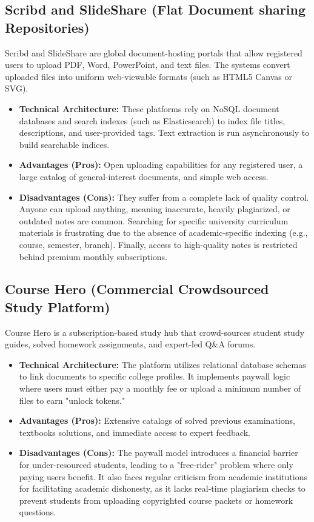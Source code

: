 \documentclass[12,Times new Roman,a4paper]{report}
\begin{document}
\subsection{Scribd and SlideShare (Flat Document sharing Repositories)}
Scribd and SlideShare are global document-hosting portals that allow registered users to upload PDF, Word, PowerPoint, and text files. The systems convert uploaded files into uniform web-viewable formats (such as HTML5 Canvas or SVG).
\begin{itemize}
    \item \textbf{Technical Architecture:} These platforms rely on NoSQL document databases and search indexes (such as Elasticsearch) to index file titles, descriptions, and user-provided tags. Text extraction is run asynchronously to build searchable indices.
    \item \textbf{Advantages (Pros):} Open uploading capabilities for any registered user, a large catalog of general-interest documents, and simple web access.
    \item \textbf{Disadvantages (Cons):} They suffer from a complete lack of quality control. Anyone can upload anything, meaning inaccurate, heavily plagiarized, or outdated notes are common. Searching for specific university curriculum materials is frustrating due to the absence of academic-specific indexing (e.g., course, semester, branch). Finally, access to high-quality notes is restricted behind premium monthly subscriptions.
\end{itemize}

\subsection{Course Hero (Commercial Crowdsourced Study Platform)}
Course Hero is a subscription-based study hub that crowd-sources student study guides, solved homework assignments, and expert-led Q\&A forums.
\begin{itemize}
    \item \textbf{Technical Architecture:} The platform utilizes relational database schemas to link documents to specific college profiles. It implements paywall logic where users must either pay a monthly fee or upload a minimum number of files to earn "unlock tokens."
    \item \textbf{Advantages (Pros):} Extensive catalogs of solved previous examinations, textbooks solutions, and immediate access to expert feedback.
    \item \textbf{Disadvantages (Cons):} The paywall model introduces a financial barrier for under-resourced students, leading to a "free-rider" problem where only paying users benefit. It also faces regular criticism from academic institutions for facilitating academic dishonesty, as it lacks real-time plagiarism checks to prevent students from uploading copyrighted course packets or homework questions.
\end{itemize}
\end{document}
